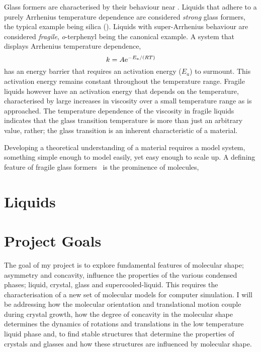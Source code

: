 Glass formers are characterised by their behaviour near \si{\Tg}. Liquids that adhere to a purely Arrhenius temperature dependence are considered \emph{strong} glass formers, the typical example being silica (). Liquids with super-Arrhenius behaviour are considered \emph{fragile}, \emph{o}-terphenyl being the canonical example. A system that displays Arrhenius temperature dependence,
\begin{equation}
    k = A \text{e}^{-E_a/(RT)}
\end{equation}
has an energy barrier that requires an activation energy ($E_a$) to surmount. This activation energy remains constant throughout the temperature range. Fragile liquids however have an activation energy that depends on the temperature\tocite, characterised by large increases in viscosity over a small temperature range as \si{\Tg} is approached. The temperature dependence of the viscosity in fragile liquids indicates that the glass transition temperature is more than just an arbitrary value, rather; the glass transition is an inherent characteristic of a material.

Developing a theoretical understanding of a material requires a model system, something simple enough to model easily, yet easy enough to scale up. A defining feature of fragile glass formers~\tabref{} is the prominence of molecules, 


\begin{figure}
    \caption{}
    \label{fig:entropy}
\end{figure}

\section{Liquids}



\section{Project Goals}

The goal of my project is to explore fundamental features of molecular shape; asymmetry and concavity, influence the properties of the various condensed phases; liquid, crystal, glass and supercooled-liquid. This requires the characterisation of a new set of molecular models for computer simulation. I will be addressing how the molecular orientation and translational motion couple during crystal growth, how the degree of concavity in the molecular shape determines the dynamics of rotations and translations in the low temperature liquid phase and, to find stable structures that determine the properties of crystals and glasses and how these structures are influenced by molecular shape.

